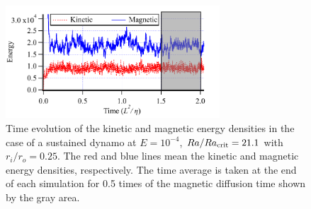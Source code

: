 \begin{figure}
\begin{center}
\includegraphics*[width=80mm]{Figures/sph_shell_383_ene.pdf}
\end{center}
\caption{
\color{blue} Time evolution of the kinetic and magnetic energy densities in the case of a sustained dynamo at $E = 10^{-4}$, $Ra / Ra_{\rm crit} = 21.1$ with $r_{i} / r_{o} = 0.25$. The red and blue lines mean the kinetic and magnetic energy densities, respectively. The time average is taken at the end of each simulation for 0.5 times of the magnetic diffusion time shown by the gray area.
}
\label{fig:fig_2}
\end{figure}